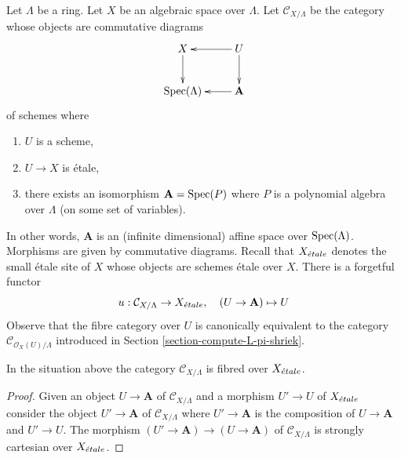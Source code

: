 \medskip\noindent
Let $\Lambda$ be a ring. Let $X$ be an algebraic space over $\Lambda$.
Let $\mathcal{C}_{X/\Lambda}$ be the category whose objects are
commutative diagrams
\begin{equation}
\label{equation-object-space}
\vcenter{
\xymatrix{
X \ar[d] & U \ar[l] \ar[d] \\
\Spec(\Lambda) & \mathbf{A} \ar[l]
}
}
\end{equation}
of schemes where
\begin{enumerate}
\item $U$ is a scheme,
\item $U \to X$ is \'etale,
\item there exists an isomorphism $\mathbf{A} = \mathop{\mathrm{Spec}}(P)$
where $P$ is a polynomial algebra over $\Lambda$ (on some set
of variables).
\end{enumerate}
In other words, $\mathbf{A}$ is an (infinite dimensional) affine space over
$\mathop{\mathrm{Spec}}(\Lambda)$. Morphisms are given by commutative diagrams.
Recall that $X_{\acute{e}tale}$ denotes the small \'etale site of $X$
whose objects are schemes \'etale over $X$.
There is a forgetful functor
$$
u : \mathcal{C}_{X/\Lambda} \to X_{\acute{e}tale},
\quad
(U \to \mathbf{A}) \mapsto U
$$
Observe that the fibre category over $U$ is canonically equivalent
to the category $\mathcal{C}_{\mathcal{O}_X(U)/\Lambda}$ introduced
in Section \ref{section-compute-L-pi-shriek}.

\begin{lemma}
\label{lemma-category-fibred-space}
In the situation above the category
$\mathcal{C}_{X/\Lambda}$ is fibred over $X_{\acute{e}tale}$.
\end{lemma}

\begin{proof}
Given an object $U \to \mathbf{A}$ of $\mathcal{C}_{X/\Lambda}$ and a morphism
$U' \to U$ of $X_{\acute{e}tale}$ consider the object $U' \to \mathbf{A}$ of
$\mathcal{C}_{X/\Lambda}$ where $U' \to \mathbf{A}$ is the composition of
$U \to \mathbf{A}$
and $U' \to U$. The morphism $(U' \to \mathbf{A}) \to (U \to \mathbf{A})$ of
$\mathcal{C}_{X/\Lambda}$ is strongly cartesian over $X_{\acute{e}tale}$.
\end{proof}

